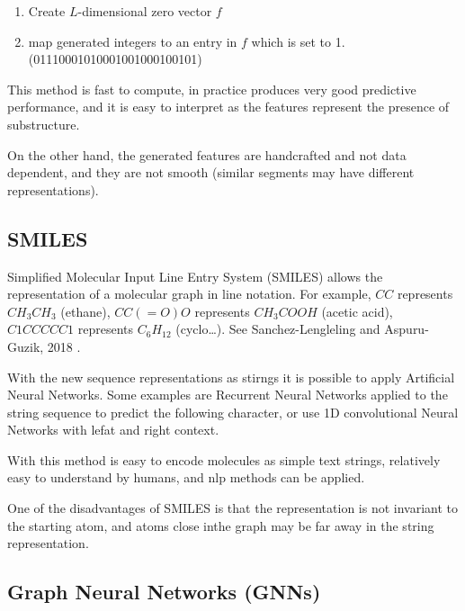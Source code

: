 \begin{enumerate}
\begin{enumerate}
\begin{figure}[h]
      \end{figure}
    \end{enumerate}
  \item Create $L$-dimensional zero vector $f$
  \item map generated integers to an entry in $f$ which is set to 1.
    (01110001010001001000100101)
\end{enumerate}


This method is fast to compute, in practice produces very good predictive
performance, and it is easy to interpret as the features represent the presence
of substructure.

On the other hand, the generated features are handcrafted and not data
dependent, and they are not smooth (similar segments may have different
representations).

\subsection{SMILES}

Simplified Molecular Input Line Entry System (SMILES) allows the representation
of a molecular graph in line notation. For example, $CC$ represents $CH_3CH_3$
(ethane), $CC(=O)O$ represents $CH_3COOH$ (acetic acid), $C1CCCCC1$ represents
$C_6H_{12}$ (cyclo\dots). See Sanchez-Lengleling and Aspuru-Guzik, 2018
\cite{gomez2018automatic}.

With the new sequence representations as stirngs it is possible to apply
Artificial Neural Networks. Some examples are Recurrent Neural Networks applied
to the string sequence to predict the following character, or use 1D
convolutional Neural Networks with lefat and right context.

With this method is easy to encode molecules as simple text strings, relatively
easy to understand by humans, and \acrfull{nlp} methods can be applied.

One of the disadvantages of SMILES is that the representation is not invariant
to the starting atom, and atoms close inthe graph may be far away in the string
representation.

\subsection{Graph Neural Networks (GNNs)}

